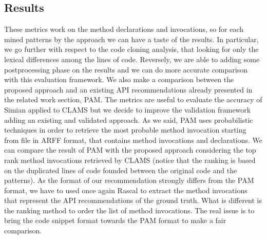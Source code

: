 \subsection{Results}

These metrics work on the method declarations and invocations, so for each mined patterns by the approach we can have a taste of the results. In particular, we go further with respect to the code cloning analysis, that looking for only the lexical differences among the lines of code. Reversely, we are able to adding some postprocessing phase on the results and we can do more accurate comparison with this evaluation framework. 
 We also make a comparison between the proposed approach and an existing API recommendations already presented in the related work section, PAM. The metrics are useful to evaluate the accuracy of Simian applied to CLAMS but we decide to improve the validation framework adding an existing and validated approach. As we said, PAM uses probabilistic techniques in order to retrieve the most probable method invocation starting from file in ARFF format, that contains method invocations and declarations. We can compare the result of PAM with the proposed approach considering the top rank method invocations retrieved by CLAMS (notice that the ranking is based on the duplicated lines of code founded between the original code and the patterns). As the format of our recommendation strongly differs from the PAM format, we have to used once again Rascal to extract the method invocations that represent the API recommendations of the ground truth. What is different is the ranking method to order the list of method invocations. The real issue is to bring the code snippet format towards the PAM format to make a fair comparison.\\
